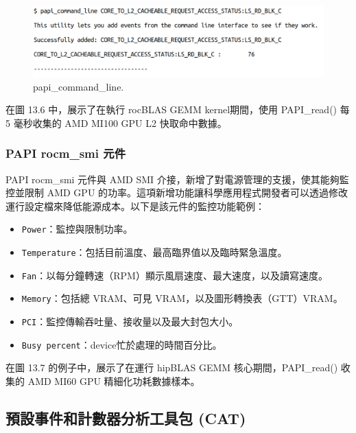 \begin{figure}
    \centering
    \includegraphics[width=0.9\linewidth]{FileAusiliari/Screenshots/Figure13-5.png}
    \caption{papi\_command\_line.}
    \label{fig:PAPI5}
\end{figure}

在圖 13.6 中，展示了在執行 rocBLAS GEMM kernel期間，使用 PAPI\_read() 每 5 毫秒收集的 AMD MI100 GPU L2 快取命中數據。

\subsubsection{PAPI rocm\_smi 元件}

PAPI rocm\_smi 元件與 AMD SMI 介接，新增了對電源管理的支援，使其能夠監控並限制 AMD GPU 的功率。這項新增功能讓科學應用程式開發者可以透過修改運行設定檔來降低能源成本。以下是該元件的監控功能範例：

\begin{itemize}
    \item \texttt{Power}：監控與限制功率。
    \item \texttt{Temperature}：包括目前溫度、最高臨界值以及臨時緊急溫度。
    \item \texttt{Fan}：以每分鐘轉速（RPM）顯示風扇速度、最大速度，以及讀寫速度。
    \item \texttt{Memory}：包括總 VRAM、可見 VRAM，以及圖形轉換表（GTT）VRAM。
    \item \texttt{PCI}：監控傳輸吞吐量、接收量以及最大封包大小。
    \item \texttt{Busy percent}：device忙於處理的時間百分比。
\end{itemize}

在圖 13.7 的例子中，展示了在運行 hipBLAS GEMM 核心期間，PAPI\_read() 收集的 AMD MI60 GPU 精細化功耗數據樣本。

\subsection{預設事件和計數器分析工具包 (CAT)}

